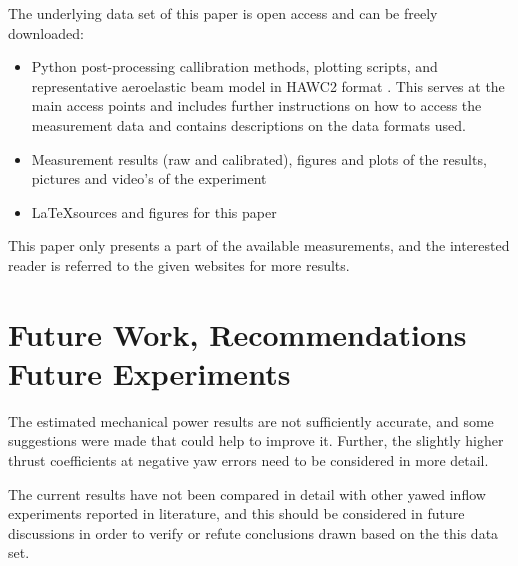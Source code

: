 \documentclass[a4paper]{jpconf}
\begin{document}
The underlying data set of this paper is open access and can be freely downloaded:
\begin{itemize}
	\item Python post-processing callibration methods, plotting scripts, and representative aeroelastic beam model in HAWC2 format \cite{github:freeyaw-ojf-wt-tests}. This serves at the main access points and includes further instructions on how to access the measurement data and contains descriptions on the data formats used.
	\item Measurement results (raw and calibrated), figures and plots of the results, pictures and video's of the experiment \cite{deic:data-sources}
	\item \LaTeX sources and figures for this paper \cite{github:torque2016-freeyaw-measurements}
\end{itemize}

This paper only presents a part of the available measurements, and the interested reader is referred to the given websites for more results.



\section{Future Work, Recommendations Future Experiments}

The estimated mechanical power results are not sufficiently accurate, and some suggestions were made that could help to improve it. Further, the slightly higher thrust coefficients at negative yaw errors need to be considered in more detail.

The current results have not been compared in detail with other yawed inflow experiments reported in literature, and this should be considered in future discussions in order to verify or refute conclusions drawn based on the this data set.
\end{document}
